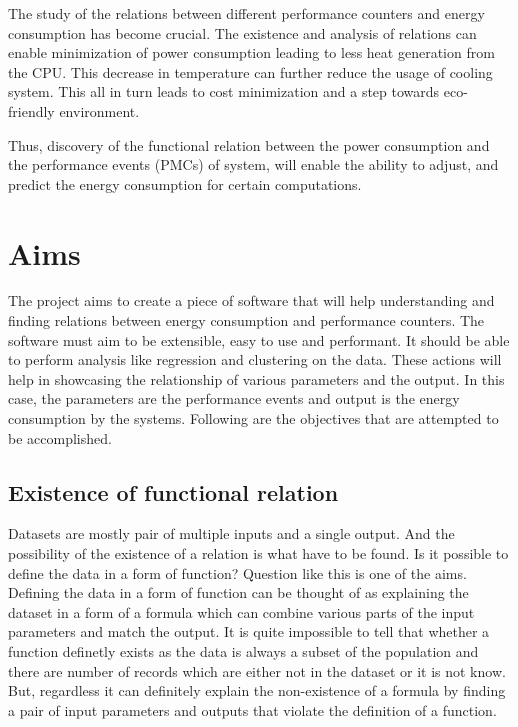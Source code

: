 The study of the relations between different performance counters and energy consumption has become crucial. The existence and analysis of relations can enable minimization of power consumption leading to less heat generation from the CPU. This decrease in temperature can further reduce the usage of cooling system. This all in turn leads to cost minimization and a step towards eco-friendly environment.

Thus, discovery of the functional relation between the power consumption and the performance events (PMCs) of system, will enable the ability to adjust, and predict the energy consumption for certain computations.

\section{Aims}

The project aims to create a piece of software that will help understanding and finding relations between energy consumption and performance counters. The software must aim to be extensible, easy to use and performant. It should be able to perform analysis like regression and clustering on the data. These actions will help in showcasing the relationship of various parameters and the output. In this case, the parameters are the performance events and output is the energy consumption by the systems. Following are the objectives that are attempted to be accomplished.

\subsection{Existence of functional relation}

Datasets are mostly pair of multiple inputs and a single output. And the possibility of the existence of a relation is what have to be found. Is it possible to define the data in a form of function? Question like this is one of the aims. Defining the data in a form of function can be thought of as explaining the dataset in a form of a formula which can combine various parts of the input parameters and match the output. It is quite impossible to tell that whether a function definetly exists as the data is always a subset of the population and there are number of records which are either not in the dataset or it is not know. But, regardless it can definitely explain the non-existence of a formula by finding a pair of input parameters and outputs that violate the definition of a function.

